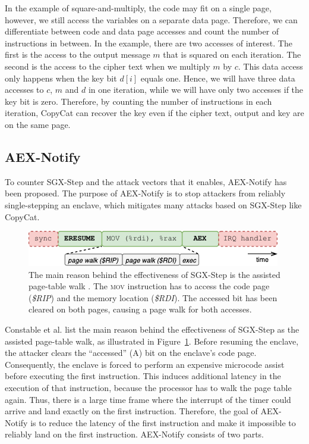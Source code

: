 \documentclass{llncs}
\begin{document}
In the example of square-and-multiply, the code may fit on a single page,
however, we still access the variables on a separate data page.
Therefore, we can differentiate between code and data page accesses
and count the number of instructions in between.
In the example, there are two accesses of interest.
The first is the access to the output message $m$ that is squared on each
iteration.
The second is the access to the cipher text when we multiply $m$ by $c$.
This data access only happens when the key bit $d[i]$ equals one.
Hence, we will have three data accesses to $c$, $m$ and $d$ in one iteration,
while we will have only two accesses if the key bit is zero.
Therefore, by counting the number of instructions in each iteration,
CopyCat can recover the key even if the cipher text, output and key are on the
same page.

\subsection{AEX-Notify}
\label{sec:aex-notify}

To counter SGX-Step and the attack vectors that it enables, AEX-Notify has been
proposed.
The purpose of AEX-Notify is to stop attackers from reliably single-stepping an
enclave, which mitigates many attacks based on SGX-Step like CopyCat.

\begin{figure}[t]
  \centering
  \includegraphics{images/sgx-step-without-prefetch.pdf}
  \caption{
    The main reason behind the effectiveness of SGX-Step is the assisted
    page-table walk \cite{ConstableBCXXAK23}.
    The \textsc{mov} instruction has to access the code page
    (\textsf{\itshape\$RIP}) and the memory location (\textsf{\itshape\$RDI}).
    The accessed bit has been cleared on both pages, causing a page walk for
    both accesses.}
  \label{fig:pte-walk}
\end{figure}

Constable et al. \cite{ConstableBCXXAK23} list the main reason behind the
effectiveness of SGX-Step as the assisted page-table walk, as illustrated in
Figure~\ref{fig:pte-walk}.
Before resuming the enclave, the attacker clears the ``accessed'' (A) bit on
the enclave's code page.
Consequently, the enclave is forced to perform an expensive microcode assist
before executing the first instruction.
This induces additional latency in the execution of that instruction, because
the processor has to walk the page table again.
Thus, there is a large time frame where the interrupt of the timer could arrive
and land exactly on the first instruction.
Therefore, the goal of AEX-Notify is to reduce the latency of the first instruction and
make it impossible to reliably land on the first instruction.
AEX-Notify consists of two parts.
\end{document}
